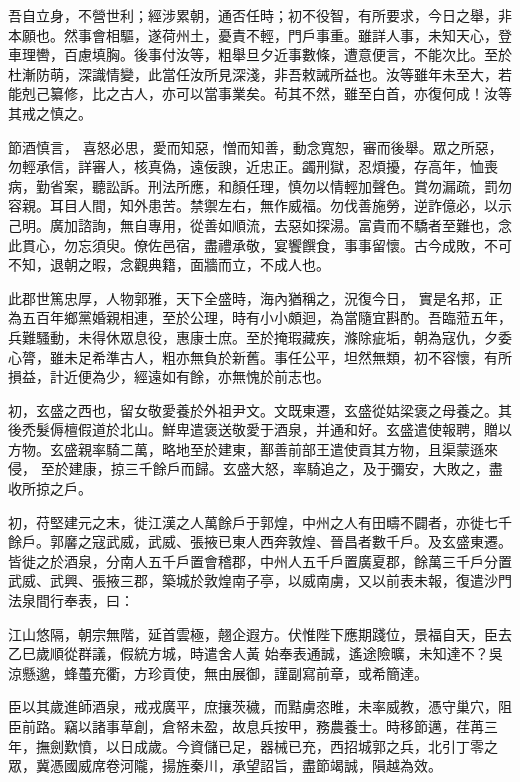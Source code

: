 \begin{pinyinscope}
 吾自立身，不營世利；經涉累朝，通否任時；初不役智，有所要求，今日之舉，非本願也。然事會相驅，遂荷州土，憂責不輕，門戶事重。雖詳人事，未知天心，登車理轡，百慮填胸。後事付汝等，粗舉旦夕近事數條，遭意便言，不能次比。至於杜漸防萌，深識情變，此當任汝所見深淺，非吾敕誡所益也。汝等雖年未至大，若能剋己纂修，比之古人，亦可以當事業矣。茍其不然，雖至白首，亦復何成！汝等其戒之慎之。



 節酒慎言，
 喜怒必思，愛而知惡，憎而知善，動念寬恕，審而後舉。眾之所惡，勿輕承信，詳審人，核真偽，遠佞諛，近忠正。蠲刑獄，忍煩擾，存高年，恤喪病，勤省案，聽訟訴。刑法所應，和顏任理，慎勿以情輕加聲色。賞勿漏疏，罰勿容親。耳目人間，知外患苦。禁禦左右，無作威福。勿伐善施勞，逆詐億必，以示己明。廣加諮詢，無自專用，從善如順流，去惡如探湯。富貴而不驕者至難也，念此貫心，勿忘須臾。僚佐邑宿，盡禮承敬，宴饗饌食，事事留懷。古今成敗，不可不知，退朝之暇，念觀典籍，面牆而立，不成人也。



 此郡世篤忠厚，人物郭雅，天下全盛時，海內猶稱之，況復今日，
 實是名邦，正為五百年鄉黨婚親相連，至於公理，時有小小頗迴，為當隨宜斟酌。吾臨蒞五年，兵難騷動，未得休眾息役，惠康士庶。至於掩瑕藏疾，滌除疵垢，朝為寇仇，夕委心膂，雖未足希準古人，粗亦無負於新舊。事任公平，坦然無類，初不容懷，有所損益，計近便為少，經遠如有餘，亦無愧於前志也。



 初，玄盛之西也，留女敬愛養於外祖尹文。文既東遷，玄盛從姑梁褒之母養之。其後禿髮傉檀假道於北山。鮮卑遣褒送敬愛于酒泉，并通和好。玄盛遣使報聘，贈以方物。玄盛親率騎二萬，略地至於建東，鄯善前部王遣使貢其方物，且渠蒙遜來侵，
 至於建康，掠三千餘戶而歸。玄盛大怒，率騎追之，及于彌安，大敗之，盡收所掠之戶。



 初，苻堅建元之末，徙江漢之人萬餘戶于郭煌，中州之人有田疇不闢者，亦徙七千餘戶。郭黁之寇武威，武威、張掖已東人西奔敦煌、晉昌者數千戶。及玄盛東遷。皆徙之於酒泉，分南人五千戶置會稽郡，中州人五千戶置廣夏郡，餘萬三千戶分置武威、武興、張掖三郡，築城於敦煌南子亭，以威南虜，又以前表未報，復遣沙門法泉間行奉表，曰：



 江山悠隔，朝宗無階，延首雲極，翹企遐方。伏惟陛下應期踐位，景福自天，臣去乙巳歲順從群議，假統方城，時遣舍人黃
 始奉表通誠，遙途險曠，未知達不？吳涼懸邈，蜂蠆充衢，方珍貢使，無由展御，謹副寫前章，或希簡達。



 臣以其歲進師酒泉，戒戎廣平，庶攘茨穢，而黠虜恣睢，未率威教，憑守巢穴，阻臣前路。竊以諸事草創，倉帑未盈，故息兵按甲，務農養士。時移節邁，荏苒三年，撫劍歎憤，以日成歲。今資儲已足，器械已充，西招城郭之兵，北引丁零之眾，冀憑國威席卷河隴，揚旌秦川，承望詔旨，盡節竭誠，隕越為效。




\end{pinyinscope}
